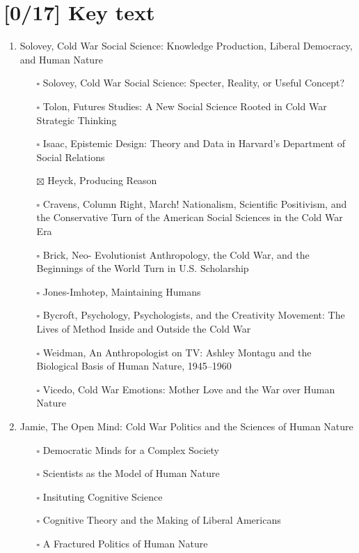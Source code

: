 \documentclass[paper=B6,portrait,twoside=true,twocolumn=false,headinclude=true,footinclude=false,fontsize=12,BCOR=10mm,DIV=calc,pagesize=auto,titlepage=firstiscover,mpinclude=false,headings=normal,headings=twolinechapter,open=right,toc=graduated,chapterprefix=false,numbers=endperiod,parskip=half+]{scrbook}
\theoremstyle{definition}
\begin{document}
\section{[0/17] Key text}
\label{sec:orge61cfff}
\begin{enumerate}
\item\relax [1/10] Solovey, Cold War Social Science: Knowledge Production, Liberal
Democracy, and Human Nature
\begin{itemize}
\item[{$\square$}] Solovey, Cold War Social Science: Specter, Reality, or Useful Concept?
\item[{$\square$}] Tolon, Futures Studies: A New Social Science Rooted in Cold War Strategic Thinking
\item[{$\square$}] Isaac, Epistemic Design: Theory and Data in Harvard’s Department of Social Relations
\item[{$\boxtimes$}] Heyck, Producing Reason
\item[{$\square$}] Cravens, Column Right, March! Nationalism, Scientific Positivism, and the Conservative Turn of the American Social Sciences in the Cold War Era
\item[{$\square$}] Brick, Neo- Evolutionist Anthropology, the Cold War, and the Beginnings of the World Turn in U.S. Scholarship
\item[{$\square$}] Jones-Imhotep, Maintaining Humans
\item[{$\square$}] Bycroft, Psychology, Psychologists, and the Creativity Movement: The Lives of Method Inside and Outside the Cold War
\item[{$\square$}] Weidman, An Anthropologist on TV: Ashley Montagu and the Biological
Basis of Human Nature, 1945–1960
\item[{$\square$}] Vicedo, Cold War Emotions: Mother Love and the War over Human Nature
\end{itemize}
\item\relax [0/5] Jamie, The Open Mind: Cold War Politics and the Sciences of Human
Nature
\begin{itemize}
\item[{$\square$}] Democratic Minds for a Complex Society
\item[{$\square$}] Scientists as the Model of Human Nature
\item[{$\square$}] Insituting Cognitive Science
\item[{$\square$}] Cognitive Theory and the Making of Liberal Americans
\item[{$\square$}] A Fractured Politics of Human Nature

\end{itemize}
\end{enumerate}
\end{document}
